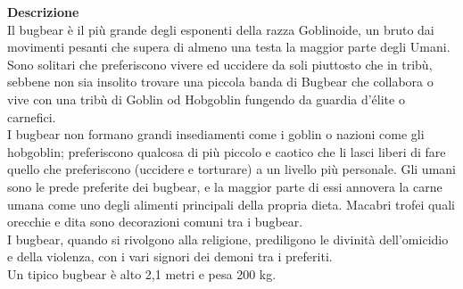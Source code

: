 \begin{multicols}{2}
\textbf{Descrizione}\\
Il bugbear è il più grande degli esponenti della razza Goblinoide, un bruto dai movimenti pesanti che supera di almeno una testa la maggior parte degli Umani. Sono solitari che preferiscono vivere ed uccidere da soli piuttosto che in tribù, sebbene non sia insolito trovare una piccola banda di Bugbear che collabora o vive con una tribù di Goblin od Hobgoblin fungendo da guardia d’élite o carnefici.\\
I bugbear non formano grandi insediamenti come i goblin o nazioni come gli hobgoblin; preferiscono qualcosa di più piccolo e caotico che li lasci liberi di fare quello che preferiscono (uccidere e torturare) a un livello più personale. Gli umani sono le prede preferite dei bugbear, e la maggior parte di essi annovera la carne umana come uno degli alimenti principali della propria dieta. Macabri trofei quali orecchie e dita sono decorazioni comuni tra i bugbear.\\
I bugbear, quando si rivolgono alla religione, prediligono le divinità dell'omicidio e della violenza, con i vari signori dei demoni tra i preferiti.\\
Un tipico bugbear è alto 2,1 metri e pesa 200 kg.\\


\end{multicols}
